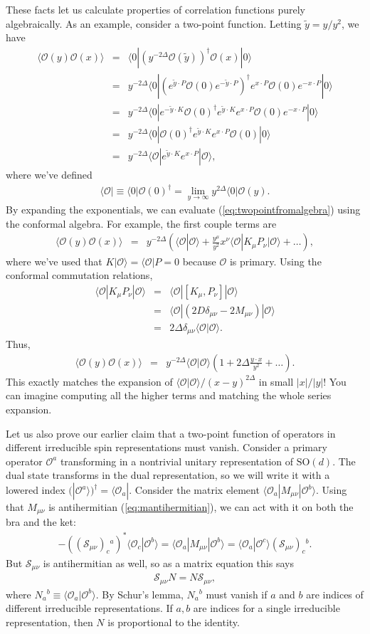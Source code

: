 \documentclass[11pt]{ws-rv9x6}
\newcommand\be{\begin{eqnarray}}
\newcommand\ee{\end{eqnarray}}
\newcommand\cO{\mathcal{O}}
\newcommand\p[1]{\left(#1\right)}
\newcommand\<\langle
\renewcommand\>\rangle
\newcommand\de\delta
\newcommand\nn{\nonumber}
\renewcommand\.{\cdot}
\newcommand\SO{\mathrm{SO}}
\newcommand\De{\Delta}
\newcommand\cS{\mathcal{S}}
\newcommand\oo\infty
\newcommand\tl[1]{\widetilde{#1}}
\begin{document}
These facts let us calculate properties of correlation functions purely algebraically.  As an example, consider a two-point function.  Letting $\tl y = y/y^2$, we have
\be
\<\cO(y)\cO(x)\> &=& \<0|(y^{-2\De}\cO(\tl y))^\dag \cO(x)|0\>\nn\\
&=& y^{-2\De}\<0|(e^{\tl y\.P}\cO(0)e^{-\tl y\.P})^\dag e^{x\.P}\cO(0)e^{-x\.P}|0\>\nn\\
&=& y^{-2\De}\<0|e^{-\tl y\.K}\cO(0)^\dag e^{\tl y\.K} e^{x\.P}\cO(0)e^{-x\.P}|0\>\nn\\
&=& y^{-2\De}\<0|\cO(0)^\dag e^{\tl y\.K} e^{x\.P}\cO(0) |0\>\nn\\
&=& y^{-2\De}\<\cO|e^{\tl y\.K} e^{x\.P}|\cO\>,
\label{eq:twopointfromalgebra}
\ee
where we've defined
\be
\<\cO| \equiv \<0|\cO(0)^\dag = \lim_{y\to \oo} y^{2\De} \<0|\cO(y).
\ee
By expanding the exponentials, we can evaluate (\ref{eq:twopointfromalgebra}) using the conformal algebra.  For example, the first couple terms are
\be
\<\cO(y)\cO(x)\> &=& y^{-2\De}\p{\<\cO|\cO\> + \frac{y^\mu}{y^2}x^\nu\<\cO|K_\mu P_\nu|\cO\>+\dots},
\ee
where we've used that $K|\cO\>=\<\cO|P=0$ because $\cO$ is primary.  Using the conformal commutation relations,
\be
\<\cO|K_\mu P_\nu|\cO\> &=& \<\cO|[K_\mu,P_\nu]|\cO\>\nn\\
&=& \<\cO|(2D\de_{\mu\nu}-2M_{\mu\nu})|\cO\>\nn\\
&=& 2\De\de_{\mu\nu}\<\cO|\cO\>.
\label{eq:normoffirstdescendant}
\ee
Thus,
\be
\<\cO(y)\cO(x)\> &=& y^{-2\De} \<\cO|\cO\>\p{1 + 2\De\frac{y\.x}{y^2}+\dots}.
\ee
This exactly matches the expansion of $\<\cO|\cO\>/(x-y)^{2\De}$ in small $|x|/|y|$!  You can imagine computing all the higher terms and matching the whole series expansion.

Let us also prove our earlier claim that a two-point function of operators in different irreducible spin representations must vanish.  Consider a primary operator $\cO^a$ transforming in a nontrivial unitary representation of $\SO(d)$. The dual state transforms in the dual representation, so we will write it with a lowered index $(|\cO^a\>)^\dag=\<\cO_a|$.  Consider the matrix element $\<\cO_a|M_{\mu\nu}|\cO^b\>$.  Using that $M_{\mu\nu}$ is antihermitian (\ref{eq:mantihermitian}), we can act with it on both the bra and the ket:
\begin{align}
-((\cS_{\mu\nu})_c{}^a)^*\<\cO_c|\cO^b\> = \<\cO_a|M_{\mu\nu}|\cO^b\> = \<\cO_a|\cO^c\>(\cS_{\mu\nu})_c{}^b.
\end{align}
But $\cS_{\mu\nu}$ is antihermitian as well, so as a matrix equation this says
\be
\cS_{\mu\nu}N=N \cS_{\mu\nu},
\ee
where $N_a{}^b\equiv\<\cO_a|\cO^b\>$.  By Schur's lemma, $N_a{}^b$ must vanish if $a$ and $b$ are indices of different irreducible representations.  If $a,b$ are indices for a single irreducible representation, then $N$ is proportional to the identity.
\end{document}
